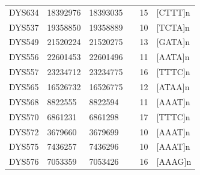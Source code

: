 \begin{tabularx}{\linewidth}{l l l l l l }
DYS634      & 18392976 & 18393035 &                        & 15 & {[}CTTT{]}n                                                                                                                          \\
DYS537      & 19358850 & 19358889 &                        & 10 & {[}TCTA{]}n                                                                                                                          \\
DYS549      & 21520224 & 21520275 &                        & 13 & {[}GATA{]}n                                                                                                                          \\
DYS556      & 22601453 & 22601496 &                        & 11 & {[}AATA{]}n                                                                                                                          \\
DYS557      & 23234712 & 23234775 &                        & 16 & {[}TTTC{]}n                                                                                                                          \\
DYS565      & 16526732 & 16526775 &                        & 12 & {[}ATAA{]}n                                                                                                                          \\
DYS568      & 8822555  & 8822594  &                        & 11 & {[}AAAT{]}n                                                                                                                          \\
DYS570      & 6861231  & 6861298  &                        & 17 & {[}TTTC{]}n                                                                                                                          \\
DYS572      & 3679660  & 3679699  &                        & 10 & {[}AAAT{]}n                                                                                                                          \\
DYS575      & 7436257  & 7436296  &                        & 10 & {[}AAAT{]}n                                                                                                                          \\
DYS576      & 7053359  & 7053426  &                        & 16 & {[}AAAG{]}n                                                                                                                          \\

\end{tabularx}
